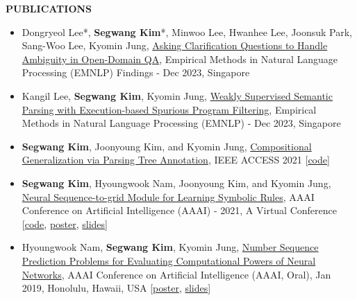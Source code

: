 \documentclass[12pt]{article}
\begin{document}
\vspace{0.2in} %


\begin{center}
	{\noindent \bfseries PUBLICATIONS}
    \noindent\makebox[\linewidth]{\rule{0.75\paperwidth}{0.4pt}}
\end{center}

\vspace{8pt} %
\begin{itemize}
\item Dongryeol Lee*, \textbf{Segwang Kim}*, Minwoo Lee, Hwanhee Lee, Joonsuk Park, Sang-Woo Lee, Kyomin Jung, \href{-}{Asking Clarification Questions to Handle Ambiguity in Open-Domain QA}, Empirical Methods in Natural Language Processing (EMNLP) Findings - Dec 2023, Singapore
\item Kangil Lee, \textbf{Segwang Kim}, Kyomin Jung, \href{-}{Weakly Supervised Semantic Parsing with Execution-based Spurious Program Filtering}, Empirical Methods in Natural Language Processing (EMNLP) - Dec 2023, Singapore
\item \textbf{Segwang Kim}, Joonyoung Kim, and Kyomin Jung, \href{https://ieeexplore.ieee.org/document/9340248}{Compositional Generalization via Parsing Tree Annotation}, IEEE ACCESS 2021 [\href{https://github.com/SegwangKim/annotation-of-targets-using-parsing-trees}{code}]
\item \textbf{Segwang Kim}, Hyoungwook Nam, Joonyoung Kim, and Kyomin Jung, 
\href{https://ojs.aaai.org/index.php/AAAI/article/view/16994}{Neural Sequence-to-grid Module for Learning Symbolic Rules}, AAAI Conference on Artificial Intelligence (AAAI) - 2021, A Virtual Conference
[\href{https://github.com/SegwangKim/neural-seq2grid-module}{code}, \href{https://segwangkim.github.io/pdfs/poster_AAAI21.pdf}{poster}, \href{https://www.slideshare.net/segwangkim/seq2grid-aaai-2021}{slides}]
\item Hyoungwook Nam, \textbf{Segwang Kim}, Kyomin Jung, \href{https://ojs.aaai.org//index.php/AAAI/article/view/4387}{Number Sequence Prediction Problems for Evaluating Computational Powers of Neural Networks}, AAAI Conference on Artificial Intelligence (AAAI, Oral), Jan 2019, Honolulu, Hawaii, USA
[\href{https://segwangkim.github.io/pdfs/poster_AAAI19.pdf}{poster}, \href{https://segwangkim.github.io/pdfs/slides_AAAI19.pdf}{slides}]


\end{itemize}
\end{document}
